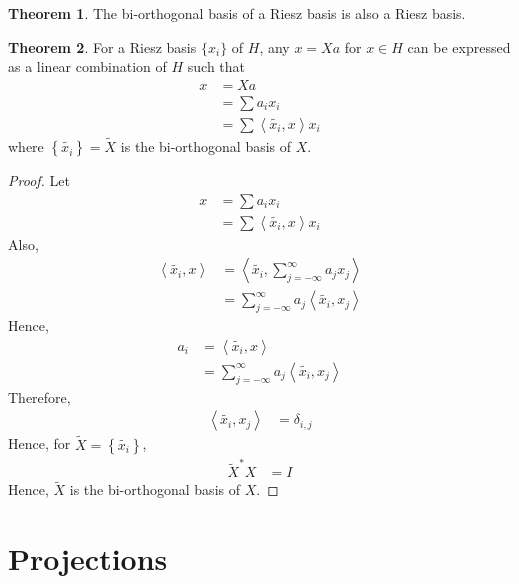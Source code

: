 \documentclass[titlepage, fleqn, a4paper, 12pt, twoside]{article}
\theoremstyle{definition}
\theoremstyle{theorem}
\newtheorem{theorem}{Theorem}
\renewcommand{\tilde}{\widetilde}
\begin{document}
\begin{theorem}
	The bi-orthogonal basis of a Riesz basis is also a Riesz basis.
\end{theorem}

\begin{theorem}
	For a Riesz basis $\{x_i\}$ of $H$, any $x = X a$ for $x \in H$ can be expressed as a linear combination of $H$ such that
	\begin{align*}
		x &= X a\\
		&= \sum a_i x_i\\
		&= \sum \left\langle \tilde{x_i} , x \right\rangle x_i
	\end{align*}
	where $\left\{ \tilde{x_i} \right\} = \tilde{X}$ is the bi-orthogonal basis of $X$.
\end{theorem}

\begin{proof}
	Let
	\begin{align*}
		x &= \sum a_i x_i\\
		&= \sum \left\langle \tilde{x_i} , x \right\rangle x_i
	\end{align*}
	Also,
	\begin{align*}
		\left\langle \tilde{x_i} , x \right\rangle &= \left\langle \tilde{x_i} , \sum\limits_{j = -\infty}^{\infty} a_j x_j \right\rangle\\
		&= \sum\limits_{j = -\infty}^{\infty} a_j \left\langle \tilde{x_i} , x_j \right\rangle
	\end{align*}
	Hence,
	\begin{align*}
		a_i &= \left\langle \tilde{x_i} , x \right\rangle\\
		&= \sum\limits_{j = -\infty}^{\infty} a_j \left\langle \tilde{x_i} , x_j \right\rangle
	\end{align*}
	Therefore,
	\begin{align*}
		\left\langle \tilde{x_i} , x_j \right\rangle &= \delta_{i,j}
	\end{align*}
	Hence, for $\tilde{X} = \left\{ \tilde{x_i} \right\}$,
	\begin{align*}
		\tilde{X}^* X &= I
	\end{align*}
	Hence, $\tilde{X}$ is the bi-orthogonal basis of $X$.
\end{proof}

\section{Projections}
\end{document}

